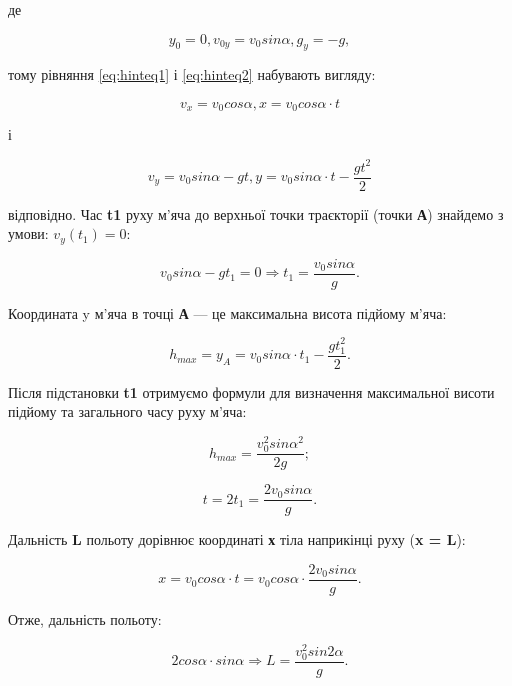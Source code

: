 де 

$$
	y_0 = 0, v_{0y} = v_0sin\alpha, g_y = -g,
$$

тому рівняння \eqref{eq:hinteq1} і \eqref{eq:hinteq2} набувають вигляду:

\begin{equation}\label{eq:hinteq3}
	v_x = v_0cos\alpha, x = v_0cos\alpha\cdot t
\end{equation}

і

\begin{equation}\label{eq:hinteq4}
	v_y = v_0sin\alpha - gt, y = v_0sin\alpha\cdot t - \dfrac{gt^2}{2}
\end{equation}

відповідно. Час \textbf{t1} руху м’яча до верхньої точки траєкторії (точки \textbf{А}) знайдемо з умови: $v_y(t_1) = 0$:

\begin{equation}\label{eq:hinteq5}
	v_0sin\alpha - gt_1 = 0 \Rightarrow t_1 = \dfrac{v_0sin\alpha}{g}.
\end{equation}

Координата y м’яча в точці \textbf{А} — це максимальна висота підйому м’яча:

\begin{equation}\label{eq:hinteq6}
	h_{max} = y_A = v_0sin\alpha\cdot t_1 - \dfrac{gt_1^2}{2}.
\end{equation}

Після підстановки \textbf{t1} отримуємо формули для визначення максимальної висоти підйому та загального часу руху м’яча:

\begin{equation}\label{eq:hinteq7}
	h_{max} = \dfrac{v_0^2sin\alpha^2}{2g};
\end{equation}

\begin{equation}\label{eq:hinteq8}
	t = 2t_1 = \dfrac{2v_0sin\alpha}{g}.
\end{equation}

Дальність \textbf{L} польоту дорівнює координаті \textbf{х} тіла наприкінці руху (\textbf{x = L}):

\begin{equation}\label{eq:hinteq9}
	x = v_0cos\alpha\cdot t = v_0cos\alpha\cdot \dfrac{2v_0sin\alpha}{g}. 
\end{equation}

Отже, дальність польоту:

\begin{equation}\label{eq:hinteq10}
	2cos\alpha\cdot sin\alpha \Rightarrow L = \dfrac{v_0^2sin2\alpha}{g}. 
\end{equation}

